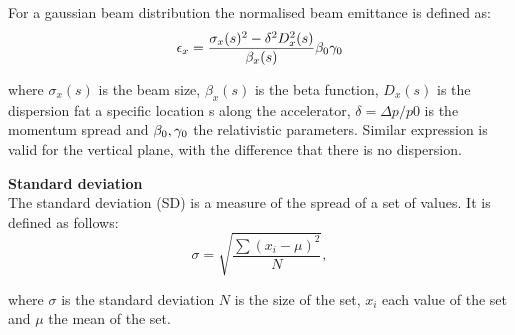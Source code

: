 \vspace*{-1mm}

For a gaussian beam distribution the normalised beam emittance is defined as:
\begin{equation}\label{eq:emit_from_beam_size}
    \epsilon_{x} = \frac{\sigma_x(s)^2 - \delta^2 D_x^2(s)}{\beta_x(s)} {\beta_0} {\gamma_0}
\end{equation}

where $\sigma_x(s)$ is the beam size, $\beta_x(s)$ is the beta function, $D_x(s)$ is the dispersion fat a specific location s along the accelerator, $\delta=\Delta p/p0$ is the momentum spread and ${\beta_0}, {\gamma_0}$ the relativistic parameters. Similar expression is valid for the vertical plane, with the difference that there is no dispersion.


\normalsize{\textbf{Standard deviation}}\\
The standard deviation (SD) is a measure of the spread of a set of values. It is defined as follows:
\begin{equation}
    \sigma = \sqrt{\frac{\sum{(x_i-\mu)^2}}{N}},
\end{equation}

where $\sigma$ is the standard deviation $N$ is the size of the set, $x_i$ each value of the set and $\mu$ the mean of the set.
